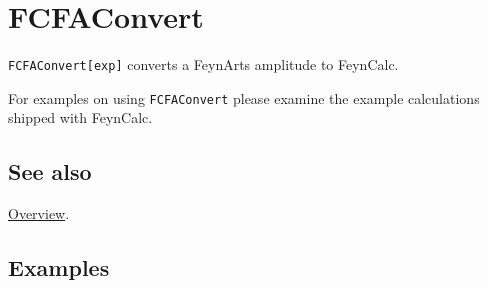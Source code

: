 \documentclass[../FeynCalcManual.tex]{subfiles}
\begin{document}
\hypertarget{fcfaconvert}{%
\section{FCFAConvert}\label{fcfaconvert}}

\texttt{FCFAConvert[\allowbreak{}exp]} converts a FeynArts amplitude to
FeynCalc.

For examples on using \texttt{FCFAConvert} please examine the example
calculations shipped with FeynCalc.

\subsection{See also}

\hyperlink{toc}{Overview}.

\subsection{Examples}
\end{document}
